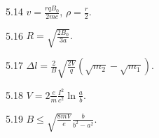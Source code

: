 \begin{Solution}{5.{14}}
	$v = \frac{rqB_0}{2mc}$, $\rho = \frac{r}{2}$.
\end{Solution}
\begin{Solution}{5.{16}}
	$R = \sqrt{\frac{2B_0}{3a}}.$
\end{Solution}
\begin{Solution}{5.{17}}
	$\Delta l = \frac{2}{B}\sqrt{\frac{2V}{q}} \left( \sqrt{m_2} - \sqrt{m_1} \right) $.
\end{Solution}
\begin{Solution}{5.{18}}
	$V = 2\frac{e}{m}\frac{I^2}{c^2}\ln\frac{a}{b}$.
\end{Solution}
\begin{Solution}{5.{19}}
	$B \le \sqrt{\frac{8mV}{e}} \frac{b}{b^2 - a^2}$.
\end{Solution}

